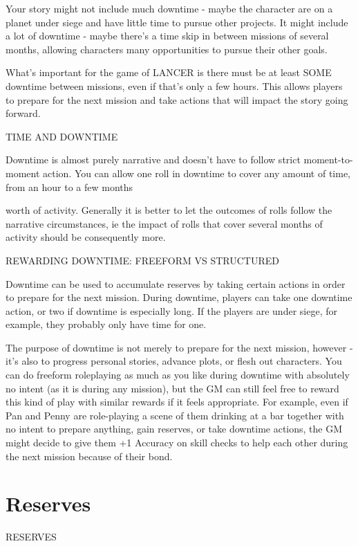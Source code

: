 Your story might not include much downtime - maybe the character are on a planet under siege
and have little time to pursue other projects. It might include a lot of downtime - maybe there’s a
time skip in between missions of several months, allowing characters many opportunities to
pursue their other goals.


What’s important for the game of LANCER is there must be at least SOME downtime between
missions, even if that’s only a few hours. This allows players to prepare for the next mission and
take actions that will impact the story going forward.


                                           TIME AND DOWNTIME


Downtime is almost purely narrative and doesn’t have to follow strict moment-to-moment action.
You can allow one roll in downtime to cover any amount of time, from an hour to a few months




worth of activity. Generally it is better to let the outcomes of rolls follow the narrative
circumstances, ie the impact of rolls that cover several months of activity should be
consequently more.


                      REWARDING DOWNTIME: FREEFORM VS STRUCTURED


Downtime can be used to accumulate reserves by taking certain actions in order to prepare for
the next mission. During downtime, players can take one downtime action, or two if downtime is
especially long. If the players are under siege, for example, they probably only have time for one.


The purpose of downtime is not merely to prepare for the next mission, however - it’s also to
progress personal stories, advance plots, or flesh out characters. You can do freeform
roleplaying as much as you like during downtime with absolutely no intent (as it is during any
mission), but the GM can still feel free to reward this kind of play with similar rewards if it
feels appropriate. For example, even if Pan and Penny are role-playing a scene of them drinking
at a bar together with no intent to prepare anything, gain reserves, or take downtime actions, the
GM might decide to give them +1 Accuracy on skill checks to help each other during the next
mission because of their bond.


\section{Reserves}
                                                 RESERVES

